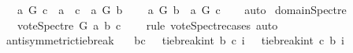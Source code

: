 \begin{isabellebody}
\ \ \ {\isasymnot}{\isacharparenleft}{\kern0pt}{\isacharparenleft}{\kern0pt}{\isacharparenleft}{\kern0pt}a\ {\isasymrightarrow}\isactrlsup {\isacharplus}{\kern0pt}\isactrlbsub G\isactrlesub \ c{\isacharparenright}{\kern0pt}\ {\isasymor}\ a\ {\isacharequal}{\kern0pt}\ c{\isacharparenright}{\kern0pt}\ {\isasymand}\ {\isasymnot}{\isacharparenleft}{\kern0pt}a\ {\isasymrightarrow}\isactrlsup {\isacharplus}{\kern0pt}\isactrlbsub G\isactrlesub \ b{\isacharparenright}{\kern0pt}{\isacharparenright}{\kern0pt}{\isasymand}\ \ \isanewline
\ \ {\isasymnot}{\isacharparenleft}{\kern0pt}{\isacharparenleft}{\kern0pt}a\ {\isasymrightarrow}\isactrlsup {\isacharplus}{\kern0pt}\isactrlbsub G\isactrlesub \ b{\isacharparenright}{\kern0pt}\ {\isasymand}\ {\isacharparenleft}{\kern0pt}a\ {\isasymrightarrow}\isactrlsup {\isacharplus}{\kern0pt}\isactrlbsub G\isactrlesub \ c{\isacharparenright}{\kern0pt}{\isacharparenright}{\kern0pt}{\isachardoublequoteclose}\isanewline
%
\isadelimproof
\ \ %
\endisadelimproof
%
\isatagproof
{}\isamarkupfalse%
\ auto%
\endisatagproof
{\isafoldproof}%
%
\isadelimproof
\isanewline
%
\endisadelimproof
\isanewline
\isanewline
{}\isamarkupfalse%
\ domain{\isacharunderscore}{\kern0pt}Spectre{\isacharcolon}{\kern0pt}\isanewline
\ \ \ {\isachardoublequoteopen}vote{\isacharunderscore}{\kern0pt}Spectre\ G\ a\ b\ c\ {\isasymin}\ {\isacharbraceleft}{\kern0pt}{\isacharminus}{\kern0pt}{}{\isacharcomma}{\kern0pt}\ {}{\isacharcomma}{\kern0pt}\ {}{\isacharbraceright}{\kern0pt}{\isachardoublequoteclose}\isanewline
%
\isadelimproof
%
\endisadelimproof
%
\isatagproof
{}\isamarkupfalse%
{\isacharparenleft}{\kern0pt}rule\ vote{\isacharunderscore}{\kern0pt}Spectre{\isachardot}{\kern0pt}cases{\isacharcomma}{\kern0pt}\ auto{\isacharparenright}{\kern0pt}\ \isamarkupfalse%
%
\endisatagproof
{\isafoldproof}%
%
\isadelimproof
\isanewline
%
\endisadelimproof
\isanewline
\isanewline
\isanewline
{}\isamarkupfalse%
\ antisymmetric{\isacharunderscore}{\kern0pt}tie{\isacharunderscore}{\kern0pt}break{\isacharcolon}{\kern0pt}\isanewline
\ \ \ {\isachardoublequoteopen}b{\isasymnoteq}c\ \ {\isasymLongrightarrow}\ tie{\isacharunderscore}{\kern0pt}break{\isacharunderscore}{\kern0pt}int\ b\ c\ i\ {\isacharequal}{\kern0pt}\ {\isacharminus}{\kern0pt}\ tie{\isacharunderscore}{\kern0pt}break{\isacharunderscore}{\kern0pt}int\ c\ b\ {\isacharparenleft}{\kern0pt}{\isacharminus}{\kern0pt}i{\isacharparenright}{\kern0pt}{\isachardoublequoteclose}\isanewline

\end{isabellebody}
